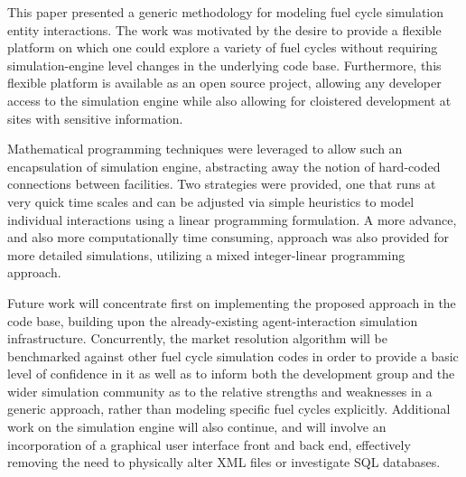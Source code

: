 This paper presented a generic methodology for modeling fuel cycle simulation
entity interactions. The work was motivated by the desire to provide a flexible
platform on which one could explore a variety of fuel cycles without requiring
simulation-engine level changes in the underlying code base. Furthermore, this
flexible platform is available as an open source project, allowing any developer
access to the simulation engine while also allowing for cloistered development
at sites with sensitive information. 

Mathematical programming techniques were leveraged to allow such an
encapsulation of simulation engine, abstracting away the notion of hard-coded
connections between facilities. Two strategies were provided, one that runs at
very quick time scales and can be adjusted via simple heuristics to model
individual interactions using a linear programming formulation. A more advance,
and also more computationally time consuming, approach was also provided for
more detailed simulations, utilizing a mixed integer-linear programming
approach.

Future work will concentrate first on implementing the proposed approach in the
\Cyclus code base, building upon the already-existing agent-interaction
simulation infrastructure. Concurrently, the market resolution algorithm will be
benchmarked against other fuel cycle simulation codes in order to provide a
basic level of confidence in it as well as to inform both the \Cyclus
development group and the wider simulation community as to the relative
strengths and weaknesses in a generic approach, rather than modeling specific
fuel cycles explicitly. Additional work on the \Cyclus simulation engine will
also continue, and will involve an incorporation of a graphical user interface
front and back end, effectively removing the need to physically alter XML files
or investigate SQL databases.
